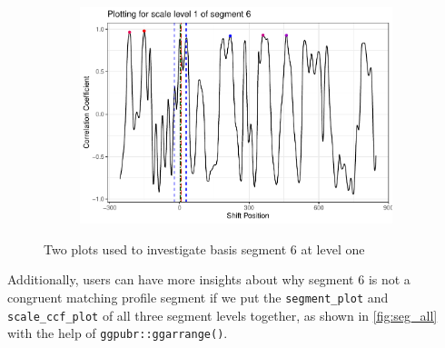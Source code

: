 \begin{figure}
\begin{subfigure}[t]{\textwidth}
\begin{adjustbox}{valign=t}
\begin{minipage}{.39\textwidth}
{\small {}
\begin{Schunk}
\end{Schunk}
}
\vspace{1em}
\end{minipage}
\begin{minipage}{.59\textwidth}
\includegraphics[width=\textwidth]{ju-hofmann_files/figure-latex/segplot2-1.pdf}
\end{minipage}
\end{adjustbox}
\end{subfigure}
\caption{\label{fig:segplots} Two plots used to investigate basis segment 6 at level one}
\end{figure}

Additionally, users can have more insights about why segment 6 is not a
congruent matching profile segment if we put the \texttt{segment\_plot}
and \texttt{scale\_ccf\_plot} of all three segment levels together, as
shown in \autoref{fig:seg_all} with the help of
\texttt{ggpubr::ggarrange()}.


